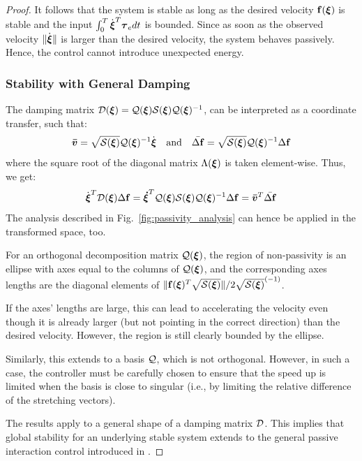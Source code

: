 \begin{proof}
It follows that the system is stable as long as the desired velocity $\mathbf{f}({\boldsymbol{\xi}})$ is stable and the input $\int_{0}^T \dot{{\boldsymbol{\xi}}}^T \boldsymbol{\tau}_e dt$ is bounded. Since as soon as the observed velocity $\| \dot{{\boldsymbol{\xi}}} \| $ is larger than the desired velocity, the system behaves passively. Hence, the control cannot introduce unexpected energy.

\subsubsection{Stability with General Damping}
The damping matrix $\mathcal{D}({\boldsymbol{\xi}}) = \mathcal{Q}({\boldsymbol{\xi}}) \mathcal{S}({\boldsymbol{\xi}}) \mathcal{Q}({\boldsymbol{\xi}})^{-1}$, can be interpreted as a coordinate transfer, such that:
\begin{equation}
	\boldsymbol{\bar v} = \sqrt{\mathcal{S}({\boldsymbol{\xi}})} \mathcal{Q}({\boldsymbol{\xi}})^{-1} \dot{{\boldsymbol{\xi}}}
	\quad \text{and} \quad
	\bar{\Delta \mathbf f} = \sqrt{\mathcal{S}({\boldsymbol{\xi}})} \mathcal{Q}({\boldsymbol{\xi}})^{-1} \Delta \mathbf{f}
\end{equation}
where the square root of the diagonal matrix $\Lambda({\boldsymbol{\xi}})$ is taken element-wise. Thus, we get:
\begin{equation}
\dot{\boldsymbol{\xi}}^T \mathcal{D}({\boldsymbol{\xi}}) \Delta \mathbf{f} = \boldsymbol{\dot \xi}^T \mathcal{Q}({\boldsymbol{\xi}}) \mathcal{S}({\boldsymbol{\xi}}) \mathcal{Q}({\boldsymbol{\xi}})^{-1} \Delta \mathbf{f} = \boldsymbol{\bar v}^T \bar{\Delta \mathbf f}
\end{equation}
The analysis described in Fig.~\ref{fig:passivity_analysis} can hence be applied in the transformed space, too. 

For an orthogonal decomposition matrix $\mathcal{Q}(\boldsymbol{{\boldsymbol{\xi}}})$, the region of non-passivity is an ellipse with axes equal to the columns of $\mathcal{Q}({\boldsymbol{\xi}})$, and the corresponding axes lengths are the diagonal elements of $\| \mathbf{f}({\boldsymbol{\xi}})^T \sqrt{\mathcal{S}({\boldsymbol{\xi}})}\| / 2 \sqrt{\mathcal{S}({\boldsymbol{\xi}})}^{(-1)}$. 

If the axes' lengths are large, this can lead to accelerating the velocity even though it is already larger (but not pointing in the correct direction) than the desired velocity. However, the region is still clearly bounded by the ellipse.

Similarly, this extends to a basis $\mathcal{Q}$, which is not orthogonal. However, in such a case, the controller must be carefully chosen to ensure that the speed up is limited when the basis is close to singular (i.e., by limiting the relative difference of the stretching vectors).

The results apply to a general shape of a damping matrix $\mathcal{D}$. This implies that global stability for an underlying stable system extends to the general passive interaction control introduced in \cite{kronander2015passive}.
\end{proof}

